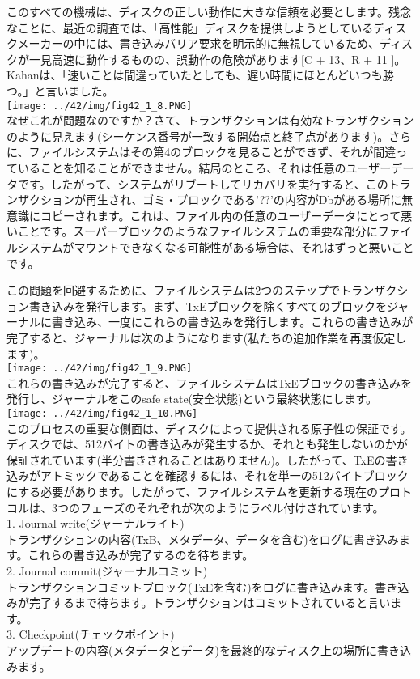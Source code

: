 このすべての機械は、ディスクの正しい動作に大きな信頼を必要とします。残念なことに、最近の調査では、「高性能」ディスクを提供しようとしているディスクメーカーの中には、書き込みバリア要求を明示的に無視しているため、ディスクが一見高速に動作するものの、誤動作の危険があります{[}C
+ 13、R + 11
{]}。Kahanは、「速いことは間違っていたとしても、遅い時間にほとんどいつも勝つ。」と言いました。\\
\texttt{[image: ../42/img/fig42\_1\_8.PNG]}\\
なぜこれが問題なのですか？さて、トランザクションは有効なトランザクションのように見えます(シーケンス番号が一致する開始点と終了点があります)。さらに、ファイルシステムはその第4のブロックを見ることができず、それが間違っていることを知ることができません。結局のところ、それは任意のユーザーデータです。したがって、システムがリブートしてリカバリを実行すると、このトランザクションが再生され、ゴミ・ブロックである'??'の内容がDbがある場所に無意識にコピーされます。これは、ファイル内の任意のユーザーデータにとって悪いことです。スーパーブロックのようなファイルシステムの重要な部分にファイルシステムがマウントできなくなる可能性がある場合は、それはずっと悪いことです。

この問題を回避するために、ファイルシステムは2つのステップでトランザクション書き込みを発行します。まず、TxEブロックを除くすべてのブロックをジャーナルに書き込み、一度にこれらの書き込みを発行します。これらの書き込みが完了すると、ジャーナルは次のようになります(私たちの追加作業を再度仮定します)。\\
\texttt{[image: ../42/img/fig42\_1\_9.PNG]}\\
これらの書き込みが完了すると、ファイルシステムはTxEブロックの書き込みを発行し、ジャーナルをこのsafe
state(安全状態)という最終状態にします。\\
\texttt{[image: ../42/img/fig42\_1\_10.PNG]}\\
このプロセスの重要な側面は、ディスクによって提供される原子性の保証です。ディスクでは、512バイトの書き込みが発生するか、それとも発生しないのかが保証されています(半分書きされることはありません)。したがって、TxEの書き込みがアトミックであることを確認するには、それを単一の512バイトブロックにする必要があります。したがって、ファイルシステムを更新する現在のプロトコルは、3つのフェーズのそれぞれが次のようにラベル付けされています。\\
1. Journal write(ジャーナルライト)\\
トランザクションの内容(TxB、メタデータ、データを含む)をログに書き込みます。これらの書き込みが完了するのを待ちます。\\
2. Journal commit(ジャーナルコミット)\\
トランザクションコミットブロック(TxEを含む)をログに書き込みます。書き込みが完了するまで待ちます。トランザクションはコミットされていると言います。\\
3. Checkpoint(チェックポイント)\\
アップデートの内容(メタデータとデータ)を最終的なディスク上の場所に書き込みます。

